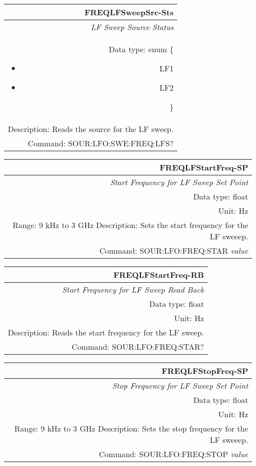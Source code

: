 \documentclass[openany]{article}
\begin{document}
		\begin{tabular}{N}
			\hline
			\bfseries FREQLFSweepSrc-Sts \\ \hline
			\emph{LF Sweep Source Status} \\
			Data type: enum \{\begin{itemize}[noitemsep]
				\small
				\item[] LF1
				\item[] LF2
			\end{itemize}\} \\ 
			Description: Reads the source for the LF sweep. \\
			Command: SOUR:LFO:SWE:FREQ:LFS? \\

		\end{tabular}
%
		\begin{tabular}{N}
			\hline
			\bfseries FREQLFStartFreq-SP \\ \hline
			\emph{Start Frequency for LF Sweep Set Point} \\
			Data type: float \\
			Unit: Hz \\ 
			Range: 9 kHz to 3 GHz
			Description: Sets the start frequency for the LF sweeep.\\
			Command: SOUR:LFO:FREQ:STAR \emph{value} \\
			
		\end{tabular}


		\begin{tabular}{N}
			\hline
			\bfseries FREQLFStartFreq-RB \\ \hline
			\emph{Start Frequency for LF Sweep Read Back} \\
			Data type: float \\
			Unit: Hz \\
			Description: Reads the start frequency for the LF sweep. \\
			Command: SOUR:LFO:FREQ:STAR? \\

		\end{tabular}
%
		\begin{tabular}{N}
			\hline
			\bfseries FREQLFStopFreq-SP \\ \hline
			\emph{Stop Frequency for LF Sweep Set Point} \\
			Data type: float \\
			Unit: Hz \\ 
			Range: 9 kHz to 3 GHz
			Description: Sets the stop frequency for the LF sweeep.\\
			Command: SOUR:LFO:FREQ:STOP \emph{value} \\
			
		\end{tabular}
\end{document}
